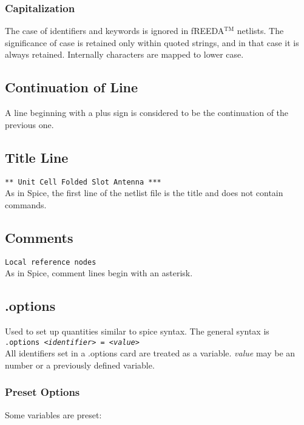 \subsubsection{Capitalization}

The case of identifiers and keywords is ignored in fREEDA$^{\mathrm{TM}}$  netlists.
The significance of case is retained only within quoted strings, and
in that case it is always retained.  Internally characters are mapped
to lower case.

\subsection{Continuation of Line}

A line beginning with a plus sign is considered to be the continuation
of the previous one.

\subsection{Title Line}

{\tt *** Unit Cell Folded Slot Antenna ***} \medskip \\
As in Spice, the first line of the netlist file is the title and does
not contain commands.

\subsection{Comments}

{\tt * Local reference nodes} \medskip \\
As in Spice, comment lines begin with an asterisk.

\subsection{.options}

Used to set up quantities similar to spice syntax.  The general syntax
is \medskip\\
{\tt .options <{\it identifier}> = <{\it value}>} \medskip \\
All identifiers set in a .options card are treated as a
variable.  {\it value} may be an number or a previously defined
variable.

\subsubsection{Preset Options}
Some variables are preset:

